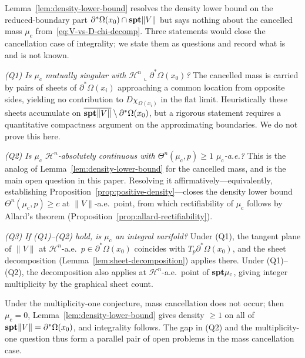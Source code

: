 \begin{remark}\label{rem:cancelled-mass-gap}
Lemma~\ref{lem:density-lower-bound} resolves the density lower bound on the reduced-boundary part $\partial^*\Omega(x_0) \cap \mathbf{spt}\|V\|$ but says nothing about the cancelled mass $\mu_{\mathrm{c}}$ from~\eqref{eq:V-vs-D-chi-decomp}. Three statements would close the cancellation case of integrality; we state them as questions and record what is and is not known.

\emph{(Q1) Is $\mu_{\mathrm{c}}$ mutually singular with $\mathcal{H}^n\llcorner\partial^*\Omega(x_0)$?}
The cancelled mass is carried by pairs of sheets of $\partial^*\Omega(x_i)$ approaching a common location from opposite sides, yielding no contribution to $D\chi_{\Omega(x_i)}$ in the flat limit. Heuristically these sheets accumulate on $\overline{\mathbf{spt}\|V\|} \setminus \partial^*\Omega(x_0)$, but a rigorous statement requires a quantitative compactness argument on the approximating boundaries. We do not prove this here.

\emph{(Q2) Is $\mu_{\mathrm{c}}$ $\mathcal{H}^n$-absolutely continuous with $\Theta^n(\mu_{\mathrm{c}}, p) \geq 1$ $\mu_{\mathrm{c}}$-a.e.?}
This is the analog of Lemma~\ref{lem:density-lower-bound} for the cancelled mass, and is the main open question in this paper. Resolving it affirmatively---equivalently, establishing Proposition~\ref{prop:positive-density}---closes the density lower bound $\Theta^n(\mu_{\mathrm{c}}, p) \geq c$ at $\|V\|$-a.e.\ point, from which rectifiability of $\mu_{\mathrm{c}}$ follows by Allard's theorem (Proposition~\ref{prop:allard-rectifiability}).

\emph{(Q3) If (Q1)--(Q2) hold, is $\mu_{\mathrm{c}}$ an integral varifold?}
Under (Q1), the tangent plane of $\|V\|$ at $\mathcal{H}^n$-a.e.\ $p \in \partial^*\Omega(x_0)$ coincides with $T_p\partial^*\Omega(x_0)$, and the sheet decomposition (Lemma~\ref{lem:sheet-decomposition}) applies there. Under (Q1)--(Q2), the decomposition also applies at $\mathcal{H}^n$-a.e.\ point of $\mathbf{spt} \mu_{\mathrm{c}}$, giving integer multiplicity by the graphical sheet count.

Under the multiplicity-one conjecture, mass cancellation does not occur; then $\mu_{\mathrm{c}} = 0$, Lemma~\ref{lem:density-lower-bound} gives density $\geq 1$ on all of $\mathbf{spt}\|V\| = \partial^*\Omega(x_0)$, and integrality follows. The gap in (Q2) and the multiplicity-one question thus form a parallel pair of open problems in the mass cancellation case.
\end{remark}

